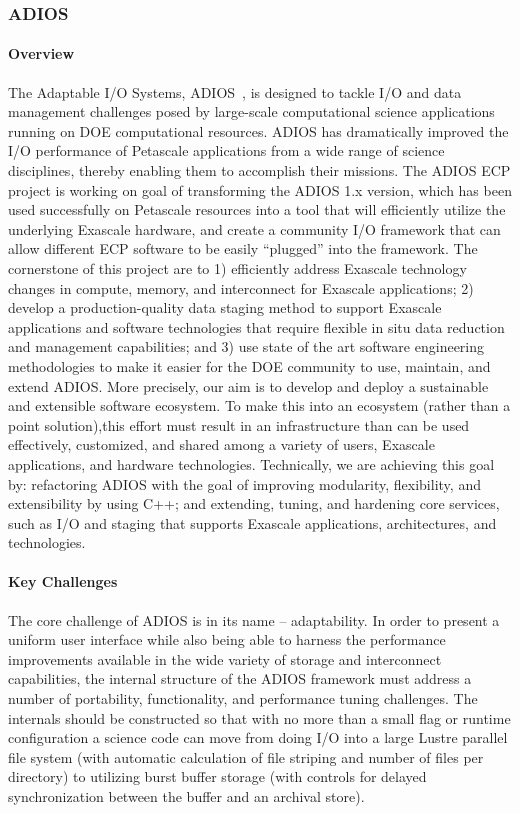 \subsubsection{ADIOS} 
\paragraph{Overview} 
The Adaptable I/O Systems, ADIOS~\cite{liu2014hello}, is designed to tackle I/O and data management challenges posed  by  large-scale computational science applications running on DOE computational resources. ADIOS has  dramatically  improved  the I/O performance of Petascale  applications from a   wide range of science disciplines, thereby enabling them to accomplish their missions. The ADIOS ECP project is working on goal of transforming the ADIOS 1.x version, which has been used successfully on Petascale resources into a tool that will efficiently utilize  the underlying Exascale hardware, and create a   community I/O framework that can allow different ECP software to be easily  “plugged” into the framework. The cornerstone of this project are to 1) efficiently  address Exascale technology changes in compute, memory, and interconnect for Exascale applications; 2) develop  a  production-quality data staging method to support Exascale applications and software  technologies that require flexible in situ data reduction and management capabilities; and 3) use state  of the  art software engineering methodologies to    make it   easier for the DOE community to    use, maintain, and extend ADIOS. More precisely, our aim is to    develop and deploy a   sustainable and extensible software ecosystem. To make this into an ecosystem (rather than a point solution),this effort must result in  an  infrastructure than can be used effectively, customized, and shared among a   variety of users, Exascale applications, and hardware technologies. Technically, we are achieving  this goal  by: refactoring ADIOS  with the  goal  of improving modularity, flexibility, and extensibility by using C++; and extending, tuning, and hardening core services, such as I/O and staging that supports Exascale applications, architectures, and technologies.

\paragraph{Key  Challenges}
The core challenge of ADIOS is in its name -- adaptability.  In order to present a uniform user interface while also being able to harness the performance improvements available in the wide variety of storage and interconnect capabilities, the internal structure of the ADIOS framework must address a number of portability, functionality, and performance tuning challenges.  The internals should be constructed so that with no more than a small flag or runtime configuration a science code can move from doing I/O into a large Lustre parallel file system (with automatic calculation of file striping and number of files per directory) to utilizing burst buffer storage (with controls for delayed synchronization between the buffer and an archival store).  

